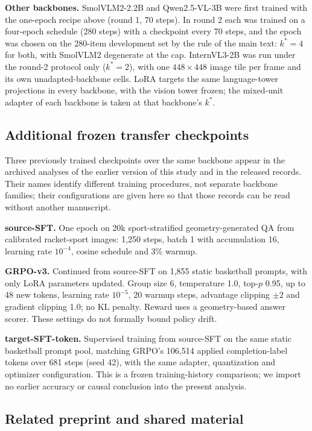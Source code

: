\documentclass[11pt]{article}
\begin{document}
\textbf{Other backbones.} SmolVLM2-2.2B and Qwen2.5-VL-3B were first trained with
the one-epoch recipe above (round 1, 70 steps). In round 2 each was trained on a
four-epoch schedule (280 steps) with a checkpoint every 70 steps, and the epoch was
chosen on the 280-item development set by the rule of the main text: $k^*=4$ for
both, with SmolVLM2 degenerate at the cap. InternVL3-2B was run under the round-2
protocol only ($k^*=2$), with one $448\times448$ image tile per frame and its own
unadapted-backbone cells. LoRA targets the same language-tower projections in every
backbone, with the vision tower frozen; the mixed-unit adapter of each backbone is
taken at that backbone's $k^*$.

\subsection{Additional frozen transfer checkpoints}

Three previously trained checkpoints over the same backbone appear in the
archived analyses of the earlier version of this study and in the released
records. Their names identify different training procedures, not separate
backbone families; their configurations are given here so that those records
can be read without another manuscript.

\textbf{source-SFT.} One epoch on 20k sport-stratified geometry-generated QA
from calibrated racket-sport images: 1,250 steps, batch 1 with accumulation 16,
learning rate $10^{-4}$, cosine schedule and 3\% warmup.

\textbf{GRPO-v3.} Continued from source-SFT on 1,855 static basketball
prompts, with only LoRA parameters updated. Group size 6, temperature 1.0,
top-$p$ 0.95, up to 48 new tokens, learning rate $10^{-5}$, 20 warmup steps,
advantage clipping $\pm2$ and gradient clipping 1.0; no KL penalty. Reward
uses a geometry-based answer scorer. These settings do not formally bound
policy drift.

\textbf{target-SFT-token.} Supervised training from source-SFT on the same
static basketball prompt pool, matching GRPO's 106,514 applied completion-label
tokens over 681 steps (seed 42), with the same adapter, quantization and
optimizer configuration. This is a frozen training-history comparison;
we import no earlier accuracy or causal conclusion into the present analysis.

\subsection{Related preprint and shared material}
\label{app:shared}
\end{document}
